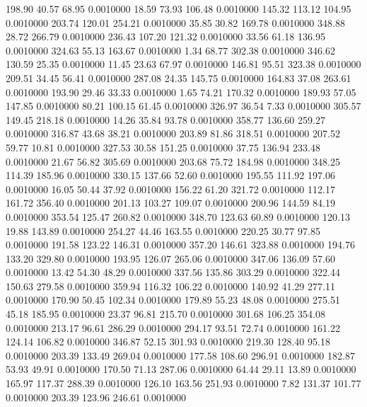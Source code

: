  198.90   40.57   68.95   0.0010000
  18.59   73.93  106.48   0.0010000
 145.32  113.12  104.95   0.0010000
 203.74  120.01  254.21   0.0010000
  35.85   30.82  169.78   0.0010000
 348.88   28.72  266.79   0.0010000
 236.43  107.20  121.32   0.0010000
  33.56   61.18  136.95   0.0010000
 324.63   55.13  163.67   0.0010000
   1.34   68.77  302.38   0.0010000
 346.62  130.59   25.35   0.0010000
  11.45   23.63   67.97   0.0010000
 146.81   95.51  323.38   0.0010000
 209.51   34.45   56.41   0.0010000
 287.08   24.35  145.75   0.0010000
 164.83   37.08  263.61   0.0010000
 193.90   29.46   33.33   0.0010000
   1.65   74.21  170.32   0.0010000
 189.93   57.05  147.85   0.0010000
  80.21  100.15   61.45   0.0010000
 326.97   36.54    7.33   0.0010000
 305.57  149.45  218.18   0.0010000
  14.26   35.84   93.78   0.0010000
 358.77  136.60  259.27   0.0010000
 316.87   43.68   38.21   0.0010000
 203.89   81.86  318.51   0.0010000
 207.52   59.77   10.81   0.0010000
 327.53   30.58  151.25   0.0010000
  37.75  136.94  233.48   0.0010000
  21.67   56.82  305.69   0.0010000
 203.68   75.72  184.98   0.0010000
 348.25  114.39  185.96   0.0010000
 330.15  137.66   52.60   0.0010000
 195.55  111.92  197.06   0.0010000
  16.05   50.44   37.92   0.0010000
 156.22   61.20  321.72   0.0010000
 112.17  161.72  356.40   0.0010000
 201.13  103.27  109.07   0.0010000
 200.96  144.59   84.19   0.0010000
 353.54  125.47  260.82   0.0010000
 348.70  123.63   60.89   0.0010000
 120.13   19.88  143.89   0.0010000
 254.27   44.46  163.55   0.0010000
 220.25   30.77   97.85   0.0010000
 191.58  123.22  146.31   0.0010000
 357.20  146.61  323.88   0.0010000
 194.76  133.20  329.80   0.0010000
 193.95  126.07  265.06   0.0010000
 347.06  136.09   57.60   0.0010000
  13.42   54.30   48.29   0.0010000
 337.56  135.86  303.29   0.0010000
 322.44  150.63  279.58   0.0010000
 359.94  116.32  106.22   0.0010000
 140.92   41.29  277.11   0.0010000
 170.90   50.45  102.34   0.0010000
 179.89   55.23   48.08   0.0010000
 275.51   45.18  185.95   0.0010000
  23.37   96.81  215.70   0.0010000
 301.68  106.25  354.08   0.0010000
 213.17   96.61  286.29   0.0010000
 294.17   93.51   72.74   0.0010000
 161.22  124.14  106.82   0.0010000
 346.87   52.15  301.93   0.0010000
 219.30  128.40   95.18   0.0010000
 203.39  133.49  269.04   0.0010000
 177.58  108.60  296.91   0.0010000
 182.87   53.93   49.91   0.0010000
 170.50   71.13  287.06   0.0010000
  64.44   29.11   13.89   0.0010000
 165.97  117.37  288.39   0.0010000
 126.10  163.56  251.93   0.0010000
   7.82  131.37  101.77   0.0010000
 203.39  123.96  246.61   0.0010000
